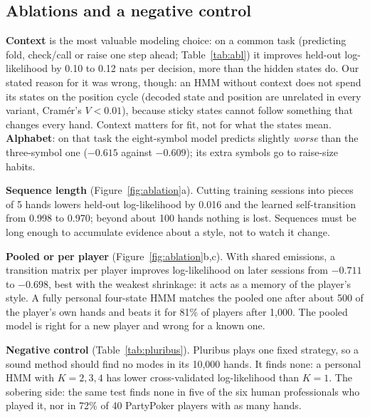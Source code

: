 \subsection{Ablations and a negative control}
\label{sec:ablations}
\textbf{Context} is the most valuable modeling choice: on a common task (predicting fold, check/call or raise one step ahead; Table~\ref{tab:abl}) it improves held-out log-likelihood by 0.10 to 0.12 nats per decision, more than the hidden states do. Our stated reason for it was wrong, though: an HMM without context does not spend its states on the position cycle (decoded state and position are unrelated in every variant, Cram\'er's $V<0.01$), because sticky states cannot follow something that changes every hand. Context matters for fit, not for what the states mean. \textbf{Alphabet}: on that task the eight-symbol model predicts slightly \emph{worse} than the three-symbol one ($-0.615$ against $-0.609$); its extra symbols go to raise-size habits.

\textbf{Sequence length} (Figure~\ref{fig:ablation}a). Cutting training sessions into pieces of 5 hands lowers held-out log-likelihood by 0.016 and the learned self-transition from 0.998 to 0.970; beyond about 100 hands nothing is lost. Sequences must be long enough to accumulate evidence about a style, not to watch it change.

\textbf{Pooled or per player} (Figure~\ref{fig:ablation}b,c). With shared emissions, a transition matrix per player improves log-likelihood on later sessions from $-0.711$ to $-0.698$, best with the weakest shrinkage: it acts as a memory of the player's style. A fully personal four-state HMM matches the pooled one after about 500 of the player's own hands and beats it for 81\% of players after 1{,}000. The pooled model is right for a new player and wrong for a known one.

\textbf{Negative control} (Table~\ref{tab:pluribus}). Pluribus plays one fixed strategy, so a sound method should find no modes in its 10{,}000 hands. It finds none: a personal HMM with $K=2,3,4$ has lower cross-validated log-likelihood than $K=1$. The sobering side: the same test finds none in five of the six human professionals who played it, nor in 72\% of 40 PartyPoker players with as many hands.
